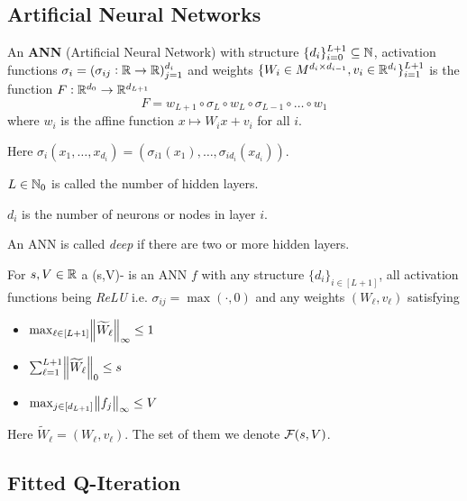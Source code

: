 

\subsection{Artificial Neural Networks}

\begin{defn}\label{def_ANN}
	An \textbf{ANN} (Artificial Neural Network) with structure
	$\{ d_i \}_{i=0}^{L+1} \subseteq \mathbb{N}$,
	activation functions $\sigma_i = (\sigma_{ij} : \mathbb{R} \to \mathbb{R})_{j=1}^{d_i}$
	and weights $\{ W_i \in M^{d_i \times d_{i-1}}, v_i \in \mathbb{R}^{d_i} \}_{i=1}^{L+1}$
	is the function $F:\mathbb{R}^{d_0} \to \mathbb{R}^{d_{L+1}}$ 
	\[ F = w_{L+1} \circ \sigma_L \circ w_L \circ \sigma_{L-1} \circ \dots \circ w_1 \]
	where $w_i$ is the affine function $x \mapsto W_i x + v_i$ for all $i$.

	Here $\sigma_i(x_1, \dots, x_{d_i})
	= (\sigma_{i1}(x_1), \dots, \sigma_{id_{i}}(x_{d_{i}}))$.

	$L \in \mathbb{N}_0$ is called the number of hidden layers.

	$d_i$ is the number of neurons or nodes in layer $i$.
\end{defn}

An ANN is called \emph{deep} if there are two or more hidden layers.

\begin{defn}
  For $s,V \in \mathbb{R}$ a (s,V)- is an ANN $f$
  with any structure $\{d_i\}_{i\in [L+1]}$,
  all activation functions being \emph{ReLU} i.e. $\sigma_{ij} = \max(\cdot, 0)$
  and any weights $(W_\ell, v_\ell)$
  satisfying
  \begin{multicols}{3}
    \begin{itemize}
      \item $\max_{\ell \in [L+1]} \norm{\widetilde{W}_\ell}_\infty \leq 1$
      \item $\sum_{\ell = 1}^{L+1} \norm{\widetilde{W}_\ell}_0 \leq s$
      \item $\max_{j \in [d_{L+1}]} \norm{f_j}_\infty \leq V$
    \end{itemize}
  \end{multicols}
  Here $\widetilde{W}_\ell = (W_\ell, v_\ell)$.
  The set of them we denote $\mathcal{F}(s,V)$.
\end{defn}

\subsection{Fitted Q-Iteration}

